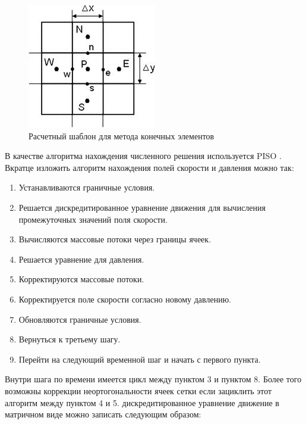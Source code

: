 \begin{figure}
    \centering
    \includegraphics{pics/b701170a-f6.jpeg}
    \caption{Расчетный шаблон для метода конечных элементов}
    \label{qhd}
\end{figure}

В качестве алгоритма нахождения численного решения используется PISO \cite{IssaGosmanWatkins-PISO}. Вкратце изложить алгоритм нахождения полей скорости и давления можно так:

\begin{enumerate}[1.]
    \item Устанавливаются граничные условия.
    \item Решается дискредитированное уравнение движения для вычисления промежуточных значений поля скорости.
    \item Вычисляются массовые потоки через границы ячеек.
    \item Решается уравнение для давления.
    \item Корректируются массовые потоки.
    \item Корректируется поле скорости согласно новому давлению.
    \item Обновляются граничные условия.
    \item Вернуться к третьему шагу.
    \item Перейти на следующий временной шаг и начать с первого пункта.
\end{enumerate}

Внутри шага по времени имеется цикл между пунктом 3 и пунктом 8. Более того возможны коррекции неортогональности ячеек сетки если зациклить этот алгоритм между пунктом 4 и 5. дискредитированное уравнение движение в матричном виде можно записать следующим образом: 

